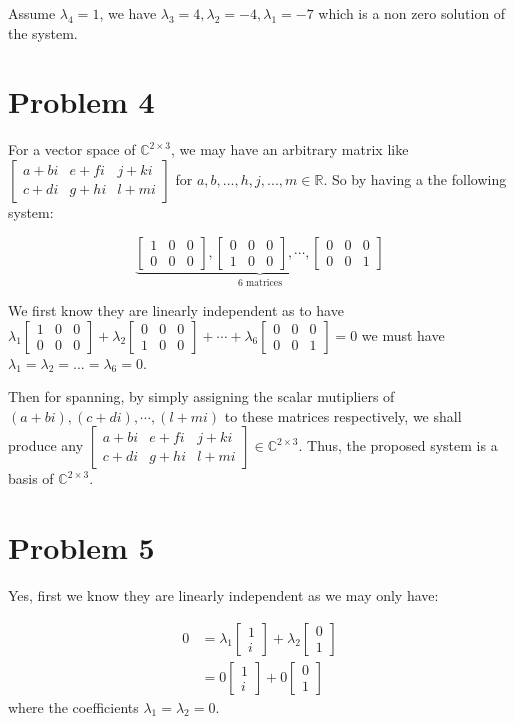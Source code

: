 \documentclass[11pt]{article}
\providecommand{\qbm}[1]{\begin{bmatrix} #1 \end{bmatrix}}
\begin{document}
Assume $\lambda_4 = 1$, we have $\lambda_3 = 4, \lambda_2 = -4, \lambda_1 = -7$ which is a non zero solution of the system.


\section*{Problem 4}

For a vector space of $\mathbb{C}^{2 \times 3}$, we may have an arbitrary matrix like $\qbm{a + bi & e + fi & j + ki \\ c + di & g + hi & l + mi}$ for $a, b, ..., h, j, ..., m \in \mathbb{R}$. So by having a the following system:

\begin{equation*}
    \underbrace{ \qbm{1 & 0 & 0 \\ 0 & 0 & 0 }, \qbm{0 & 0 & 0 \\ 1 & 0 & 0 }, \cdots, \qbm{0 & 0 & 0 \\ 0 & 0 & 1}}_\text{6 matrices}
\end{equation*}

We first know they are linearly independent as to have $\lambda_1 \qbm{1 & 0 & 0 \\ 0 & 0 & 0 } +\lambda_2  \qbm{0 & 0 & 0 \\ 1 & 0 & 0 } +  \cdots + \lambda_6 \qbm{0 & 0 & 0 \\ 0 & 0 & 1} = 0$ we must have $\lambda_1 = \lambda_2 = ... = \lambda_6 = 0$.

Then for spanning, by simply assigning the scalar mutipliers of $(a + bi), (c + di), \cdots, (l + mi)$ to these matrices respectively, we shall produce any $\qbm{a + bi & e + fi & j + ki \\ c + di & g + hi & l + mi} \in \mathbb{C}^{2 \times 3}$. Thus, the proposed system is a basis of $\mathbb{C}^{2 \times 3}$.

\section*{Problem 5}

Yes, first we know they are linearly independent as we may only have:

\begin{align*}
    0 &= \lambda_1 \begin{bmatrix} 1 \\ i \end{bmatrix} + \lambda_2 \begin{bmatrix} 0 \\ 1 \end{bmatrix} \\
    &= 0 \begin{bmatrix} 1 \\ i \end{bmatrix} + 0 \begin{bmatrix} 0 \\ 1 \end{bmatrix}
\end{align*}
where the coefficients $\lambda_1 = \lambda_2 = 0$.
\end{document}
